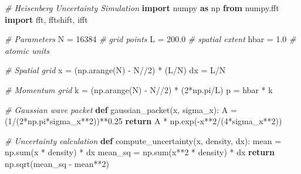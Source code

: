 \documentclass[
]{article}
\newenvironment{Shaded}{}{}
\newcommand{\BuiltInTok}[1]{\textcolor[rgb]{0.00,0.50,0.00}{#1}}
\newcommand{\CommentTok}[1]{\textcolor[rgb]{0.38,0.63,0.69}{\textit{#1}}}
\newcommand{\ControlFlowTok}[1]{\textcolor[rgb]{0.00,0.44,0.13}{\textbf{#1}}}
\newcommand{\DecValTok}[1]{\textcolor[rgb]{0.25,0.63,0.44}{#1}}
\newcommand{\FloatTok}[1]{\textcolor[rgb]{0.25,0.63,0.44}{#1}}
\newcommand{\ImportTok}[1]{\textcolor[rgb]{0.00,0.50,0.00}{\textbf{#1}}}
\newcommand{\KeywordTok}[1]{\textcolor[rgb]{0.00,0.44,0.13}{\textbf{#1}}}
\newcommand{\NormalTok}[1]{#1}
\newcommand{\OperatorTok}[1]{\textcolor[rgb]{0.40,0.40,0.40}{#1}}
\begin{document}
\begin{Shaded}
\begin{Highlighting}[]
\CommentTok{\# Heisenberg Uncertainty Simulation}
\ImportTok{import}\NormalTok{ numpy }\ImportTok{as}\NormalTok{ np}
\ImportTok{from}\NormalTok{ numpy.fft }\ImportTok{import}\NormalTok{ fft, fftshift, ifft}

\CommentTok{\# Parameters}
\NormalTok{N }\OperatorTok{=} \DecValTok{16384}  \CommentTok{\# grid points}
\NormalTok{L }\OperatorTok{=} \FloatTok{200.0}  \CommentTok{\# spatial extent}
\NormalTok{hbar }\OperatorTok{=} \FloatTok{1.0}  \CommentTok{\# atomic units}

\CommentTok{\# Spatial grid}
\NormalTok{x }\OperatorTok{=}\NormalTok{ (np.arange(N) }\OperatorTok{{-}}\NormalTok{ N}\OperatorTok{//}\DecValTok{2}\NormalTok{) }\OperatorTok{*}\NormalTok{ (L}\OperatorTok{/}\NormalTok{N)}
\NormalTok{dx }\OperatorTok{=}\NormalTok{ L}\OperatorTok{/}\NormalTok{N}

\CommentTok{\# Momentum grid}
\NormalTok{k }\OperatorTok{=}\NormalTok{ (np.arange(N) }\OperatorTok{{-}}\NormalTok{ N}\OperatorTok{//}\DecValTok{2}\NormalTok{) }\OperatorTok{*}\NormalTok{ (}\DecValTok{2}\OperatorTok{*}\NormalTok{np.pi}\OperatorTok{/}\NormalTok{L)}
\NormalTok{p }\OperatorTok{=}\NormalTok{ hbar }\OperatorTok{*}\NormalTok{ k}

\CommentTok{\# Gaussian wave packet}
\KeywordTok{def}\NormalTok{ gaussian\_packet(x, sigma\_x):}
\NormalTok{    A }\OperatorTok{=}\NormalTok{ (}\DecValTok{1}\OperatorTok{/}\NormalTok{(}\DecValTok{2}\OperatorTok{*}\NormalTok{np.pi}\OperatorTok{*}\NormalTok{sigma\_x}\OperatorTok{**}\DecValTok{2}\NormalTok{))}\OperatorTok{**}\FloatTok{0.25}
    \ControlFlowTok{return}\NormalTok{ A }\OperatorTok{*}\NormalTok{ np.exp(}\OperatorTok{{-}}\NormalTok{x}\OperatorTok{**}\DecValTok{2}\OperatorTok{/}\NormalTok{(}\DecValTok{4}\OperatorTok{*}\NormalTok{sigma\_x}\OperatorTok{**}\DecValTok{2}\NormalTok{))}

\CommentTok{\# Uncertainty calculation}
\KeywordTok{def}\NormalTok{ compute\_uncertainty(x, density, dx):}
\NormalTok{    mean }\OperatorTok{=}\NormalTok{ np.}\BuiltInTok{sum}\NormalTok{(x }\OperatorTok{*}\NormalTok{ density) }\OperatorTok{*}\NormalTok{ dx}
\NormalTok{    mean\_sq }\OperatorTok{=}\NormalTok{ np.}\BuiltInTok{sum}\NormalTok{(x}\OperatorTok{**}\DecValTok{2} \OperatorTok{*}\NormalTok{ density) }\OperatorTok{*}\NormalTok{ dx}
    \ControlFlowTok{return}\NormalTok{ np.sqrt(mean\_sq }\OperatorTok{{-}}\NormalTok{ mean}\OperatorTok{**}\DecValTok{2}\NormalTok{)}


\end{Highlighting}
\end{Shaded}
\end{document}
